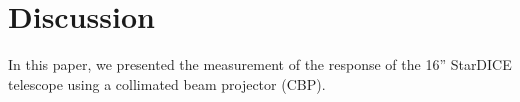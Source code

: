 \section{Discussion}
\label{sec:discussion}

In this paper, we presented the measurement of the response of the
16'' StarDICE telescope using a collimated beam projector (CBP).
